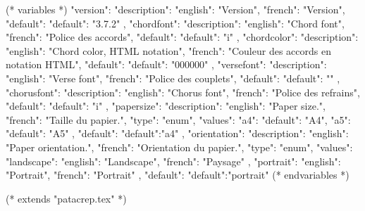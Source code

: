 %
%
%

(* variables *)
{
"version":{ "description": {"english": "Version", "french": "Version"},
            "default": {"default": "3.7.2"}
         },
"chordfont":{ "description": {"english": "Chord font",
                          "french": "Police des accords"},
            "default": {"default": "i"}
         },
"chordcolor":{ "description": {"english": "Chord color, HTML notation",
                          "french": "Couleur des accords en notation HTML"},
            "default": {"default": "000000"}
         },
"versefont":{ "description": {"english": "Verse font",
                          "french": "Police des couplets"},
            "default": {"default": ""}
         },
"chorusfont":{ "description": {"english": "Chorus font",
                          "french": "Police des refrains"},
            "default": {"default": "i"}
         },
"papersize":{ "description": {"english": "Paper size.",
                          "french": "Taille du papier."},
            "type": "enum",
            "values": {"a4": {"default": "A4"},
                       "a5": {"default": "A5"}
                     },
            "default": {"default":"a4"}
         },
"orientation":{ "description": {"english": "Paper orientation.",
                          "french": "Orientation du papier."},
            "type": "enum",
            "values": {"landscape": {"english": "Landscape", "french": "Paysage" },
                       "portrait": {"english": "Portrait", "french": "Portrait" }
                     },
            "default": {"default":"portrait"}
         }
}
(* endvariables *)

(* extends "patacrep.tex" *)

